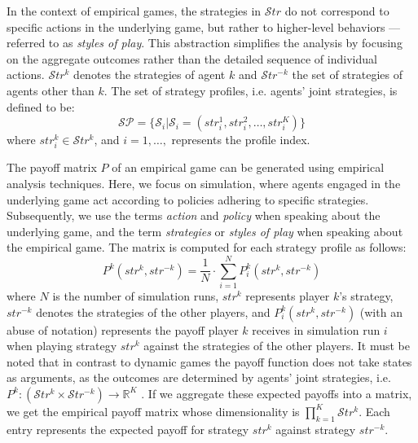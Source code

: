         \noindent
        In the context of empirical games, the strategies in $\mathcal{S}tr$ do not correspond to specific actions in the underlying game, but rather to higher-level behaviors —referred to as \emph{styles of play}. This abstraction simplifies the analysis by focusing on the aggregate outcomes rather than the detailed sequence of individual actions. $\mathcal{S}tr^k$ denotes the strategies of agent $k$ and $\mathcal{S}tr^{-k}$ the set of strategies of agents other than $k$. The set of strategy profiles, i.e. agents' joint strategies, is defined to be:
        \begin{equation}
            \mathcal{SP} = \{\mathcal{S}_i | \mathcal{S}_i = (str_i^1, str_i^2, \dots, str_i^K)\}
            \label{eq:strategy_profiles}
        \end{equation}
        where $str_i^k \in \mathcal{S}tr^k$, and $i = 1, \dots,$ represents the profile index.\tinydouble
        
        \noindent
        The payoff matrix $P$ of an empirical game can be generated using empirical analysis techniques. Here, we focus on simulation, where agents engaged in the underlying game act according to policies adhering to specific strategies. Subsequently, we use the terms \emph{action} and \emph{policy} when speaking about the underlying game, and the term \emph{strategies} or \emph{styles of play} when speaking about the empirical game. The matrix is computed for each strategy profile as follows:
        \begin{equation}
            P^k(str^k, str^{-k}) =\frac{1}{N} \cdot \sum_{i=1}^{N} P^k_{i}(str^k, str^{-k})
            \label{eq:meta_payoff}
        \end{equation}
        where $N$ is the number of simulation runs, $str^k$ represents player $k$'s strategy, $str^{-k}$ denotes the strategies of the other players, and $P^k_{i}(str^k, str^{-k})$ (with an abuse of notation) represents the payoff player $k$ receives in simulation run $i$ when playing strategy $str^k$ against the strategies of the other players. It must be noted that in contrast to dynamic games the payoff function does not take states as arguments, as the outcomes are determined by agents' joint strategies, i.e. $P^k: (\mathcal{S}tr^k \times \mathcal{S}tr^{-k}) \to \mathbb{R}^K$ \cite{omidshafiei2019alpharank}. If we aggregate these expected payoffs into a matrix, we get the empirical payoff matrix whose dimensionality is $\prod_{k=1}^K\mathcal{S}tr^k$. Each entry represents the expected payoff for strategy $str^k$ against strategy $str^{-k}$.